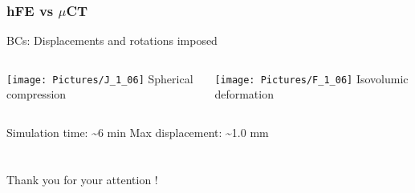 \documentclass[xcolor=table,11pt]{beamer}
\begin{document}
	\begin{frame}
		\frametitle{hFE vs $\mu$CT}
		\centering
		BCs: Displacements and rotations imposed
		\begin{columns}
			\texttt{[image: Pictures/J\_1\_06]}
			Spherical compression
			
			\texttt{[image: Pictures/F\_1\_06]}
			Isovolumic deformation
		\end{columns}
		
		Simulation time: \textasciitilde6 min \hfill Max displacement: \textasciitilde1.0 mm		
	\end{frame}
	
	
	\section{}
	\begin{frame}
		Thank you for your attention !	
	\end{frame}
	
	
	
	
	
\end{document}
